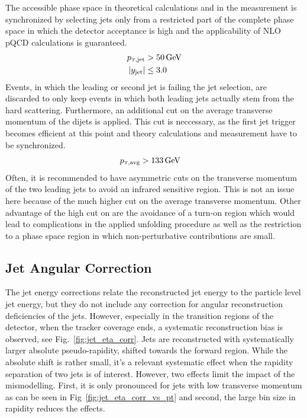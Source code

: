 The accessible phase space in theoretical calculations and in the measurement is
synchronized by selecting jets only from a restricted part of the complete phase
space in which the detector acceptance is high and the applicability of NLO
pQCD calculations is guaranteed.
%
\begin{align*}
    \ptjet &> \SI{50}{\GeV}\\
    |y_\mathrm{jet}| &\leq 3.0\\
\end{align*}
%
Events, in which the leading or second jet is failing the jet selection, are
discarded to only keep events in which both leading jets actually stem
from the hard scattering. Furthermore, an additional cut on the
average transverse momentum of the dijets is applied. This cut is neccessary, as
the first jet trigger becomes efficient at this point and theory calculations
and measurement have to be synchronized.
%
\begin{align*}
    \ptavg &> \SI{133}{\GeV}
\end{align*}
%
Often, it is recommended to have asymmetric cuts on the transverse momentum of
the two leading jets to avoid an infrared sensitive region. This is not an issue
here because of the much higher cut on the average transverse momentum. Other
advantage of the high cut on \ptavg are the avoidance of a turn-on region which
would lead to complications in the applied unfolding procedure as well as the
restriction to a phase space region in which non-perturbative contributions are
small.

\subsection{Jet Angular Correction}

The jet energy corrections relate the reconstructed jet energy to the
particle level jet energy, but they do not include any correction for angular
reconstruction deficiencies of the jets. However, especially in the transition
regions of the detector, \ie when the tracker coverage ends, a systematic
reconstruction bias is observed, see Fig.~\ref{fig:jet_eta_corr}. Jets are
reconstructed with systematically larger absolute pseudo-rapidity, \ie shifted
towards the forward region. While the absolute shift is rather small, it's a
relevant systematic effect when the rapidity separation of two jets is of
interest. However, two effects limit the impact of the mismodelling. First, it
is only pronounced for jets with low transverse momentum as can be seen in
Fig~\ref{fig:jet_eta_corr_vs_pt} and second, the large bin size in rapidity
reduces the effects. 

